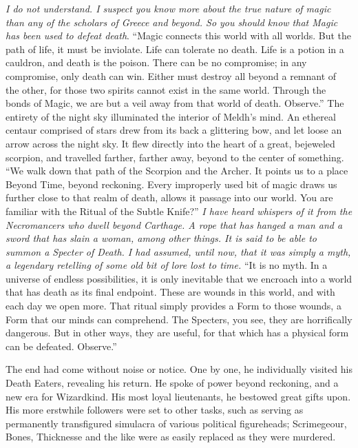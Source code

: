 \begin{flushright}
\SmallVSpace
\emph{I do not understand. I suspect you know more about the true nature of magic than any of the scholars of Greece and beyond. So you should know that Magic has been used to defeat death}.
\SmallVSpace
“Magic connects this world with all worlds. But the path of life, it must be inviolate. Life can tolerate no death. Life is a potion in a cauldron, and death is the poison. There can be no compromise; in any compromise, only death can win. Either must destroy all beyond a remnant of the other, for those two spirits cannot exist in the same world. Through the bonds of Magic, we are but a veil away from that world of death. Observe.”
\SmallVSpace
The entirety of the night sky illuminated the interior of Meldh’s mind. An ethereal centaur comprised of stars drew from its back a glittering bow, and let loose an arrow across the night sky. It flew directly into the heart of a great, bejeweled scorpion, and travelled farther, farther away, beyond to the center of something.
\SmallVSpace
“We walk down that path of the Scorpion and the Archer. It points us to a place Beyond Time, beyond reckoning. Every improperly used bit of magic draws us further close to that realm of death, allows it passage into our world. You are familiar with the Ritual of the Subtle Knife?”
\SmallVSpace
\emph{I have heard whispers of it from the Necromancers who dwell beyond Carthage. A rope that has hanged a man and a sword that has slain a woman, among other things. It is said to be able to summon a Specter of Death. I had assumed, until now, that it was simply a myth, a legendary retelling of some old bit of lore lost to time.}
\SmallVSpace
“It is no myth. In a universe of endless possibilities, it is only inevitable that we encroach into a world that has death as its final endpoint. These are wounds in this world, and with each day we open more. That ritual simply provides a Form to those wounds, a Form that our minds can comprehend. The Specters, you see, they are horrifically dangerous. But in other ways, they are useful, for that which has a physical form can be defeated. Observe.”
\end{flushright}
\simpleline
{}
The end had come without noise or notice. One by one, he individually visited his Death Eaters, revealing his return. He spoke of power beyond reckoning, and a new era for Wizardkind. His most loyal lieutenants, he bestowed great gifts upon. His more erstwhile followers were set to other tasks, such as serving as permanently transfigured simulacra of various political figureheads; Scrimegeour, Bones, Thicknesse and the like were as easily replaced as they were murdered.

